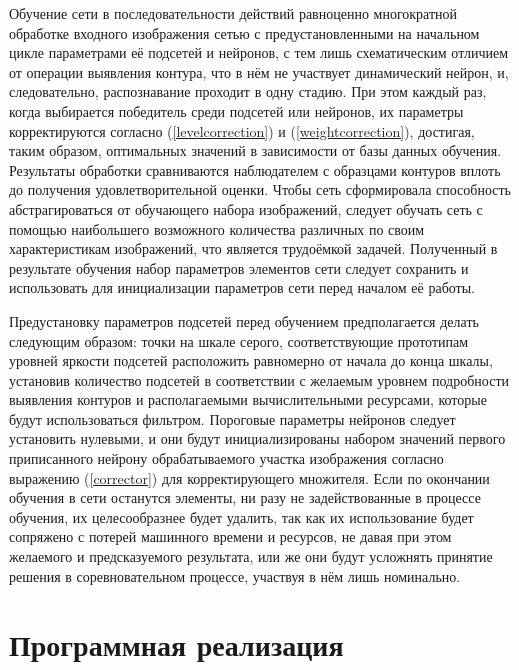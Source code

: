 \documentclass[a4paper,12pt]{report}
\begin{document}
Обучение сети в последовательности действий равноценно многократной обработке входного изображения сетью с предустановленными на начальном цикле параметрами её подсетей и нейронов, с тем лишь схематическим отличием от операции выявления контура, что в нём не участвует динамический нейрон, и, следовательно, распознавание проходит в одну стадию. При этом каждый раз, когда выбирается победитель среди подсетей или нейронов, их параметры корректируются согласно (\ref{levelcorrection}) и (\ref{weightcorrection}), достигая, таким образом, оптимальных значений в зависимости от базы данных обучения. Результаты обработки сравниваются наблюдателем с образцами контуров вплоть до получения удовлетворительной оценки. Чтобы сеть сформировала способность абстрагироваться от обучающего набора изображений, следует обучать сеть с помощью наибольшего возможного количества различных по своим характеристикам изображений, что является трудоёмкой задачей. Полученный в результате обучения набор параметров элементов сети следует сохранить и использовать для инициализации параметров сети перед началом её работы.

Предустановку параметров подсетей перед обучением предполагается делать следующим образом: точки на шкале серого, соответствующие прототипам уровней яркости подсетей расположить равномерно от начала до конца шкалы, установив количество подсетей в соответствии с желаемым уровнем подробности выявления контуров и располагаемыми вычислительными ресурсами, которые будут использоваться фильтром. Пороговые параметры нейронов следует установить нулевыми, и они будут инициализированы набором значений первого приписанного нейрону обрабатываемого участка изображения согласно выражению (\ref{corrector}) для корректирующего множителя. Если по окончании обучения в сети останутся элементы, ни разу не задействованные в процессе обучения, их целесообразнее будет удалить, так как их использование будет сопряжено с потерей машинного времени и ресурсов, не давая при этом желаемого и предсказуемого результата, или же они будут усложнять принятие решения в соревновательном процессе, участвуя в нём лишь номинально.

\chapter{Программная реализация}
\end{document}
